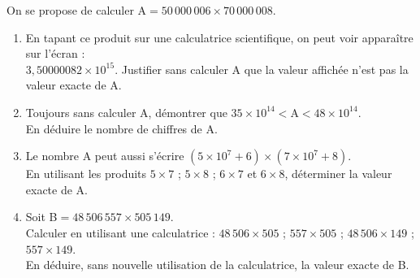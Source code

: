 \begin{exercice}[CRPE 2008 G6] %
   On se propose de calculer A$= 50\,000\,006 \times 70\,000\,008$.
   \begin{enumerate}
      \item En tapant ce produit sur une calculatrice scientifique, on peut voir apparaître sur l'écran : \\
         $3,50000082\times10^{15}$. Justifier sans calculer A que la valeur affichée n'est pas la valeur exacte de A.
      \item Toujours sans calculer A, démontrer que $35\times10^{14} < \text{A} < 48\times10^{14}$. \\
         En déduire le nombre de chiffres de A.
      \item Le nombre A peut aussi s'écrire $(5 \times 10^7+6)\times(7\times10^7+8)$. \\
         En utilisant les produits $5\times7$ ; $5\times8$ ; $6\times7$ et $6\times8$, déterminer la valeur exacte de A.
      \item Soit B$ =48\,506\,557\times505\,149$. \\
         Calculer en utilisant une calculatrice : $48\,506\times505$ ; $557\times505$ ; $48\,506\times149$ ; $557\times149$. \\
         En déduire, sans nouvelle utilisation de la calculatrice, la valeur exacte de B.
   \end{enumerate}
\end{exercice}

